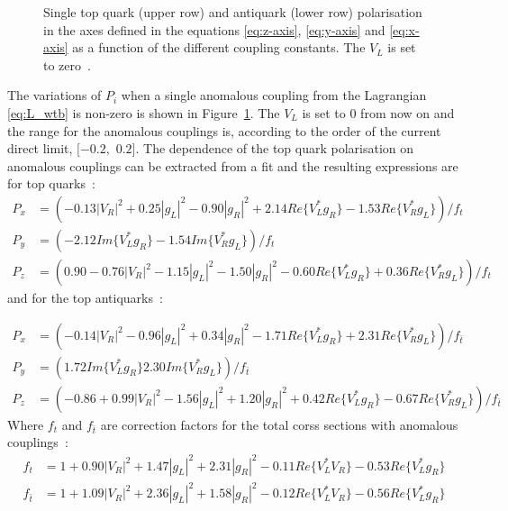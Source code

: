 \begin{figure}
\caption{Single top quark (upper row) and antiquark (lower row) polarisation in the axes defined in the equations \eqref{eq:z-axis}, \eqref{eq:y-axis} and \ref{eq:x-axis} as a function of the different coupling constants. The $V_L$ is set to zero~\cite{Aguilar-Saavedra:2014eqa}.} \label{Fig:Polarisation6pack}
\end{figure}

The variations of $P_i$ when a single anomalous coupling from the Lagrangian  \eqref{eq:L_wtb} is non-zero is shown in Figure~\ref{Fig:Polarisation6pack}. The $V_L$ is set to 0 from now on and the range for the anomalous couplings is, according to the order of the current direct limit, $[-0.2,$ $0.2]$. The dependence of the top quark polarisation on anomalous couplings can be extracted from a fit and the resulting expressions are for top quarks~\cite{Aguilar-Saavedra:2014eqa}:
\begin{align*} %
P_x &= (-0.13|V_R|^2+0.25|g_L|^2-0.90|g_R|^2  +2.14 Re\{ V_L^* g_R \} -1.53Re\{ V_R^* g_L \})/f_t \\
P_y &= (-2.12Im\{ V_L^* g_R \} -1.54Im\{ V_R^* g_L \})/f_t \\
P_z &= (0.90 - 0.76|V_R|^2 -1.15|g_L|^{2}-1.50|g_R|^{2}-0.60 Re\{ V_L^* g_R \} +0.36 Re\{ V_R^* g_L \})/f_t
\end{align*}
and for the top antiquarks~\cite{Aguilar-Saavedra:2014eqa}:

\begin{align*} %
P_x &= (-0.14|V_R|^2-0.96|g_L|^2+0.34|g_R|^2 -1.71 Re\{ V_L^* g_R \} +2.31 Re\{ V_R^* g_L \})/f_{\bar{t}} \\
P_y &= (1.72 Im\{ V_L^* g_R \} 2.30 Im\{ V_R^* g_L \})/f_{\bar{t}} \\
P_z &= (-0.86 +0.99 |V_R|^2 -1.56|g_L|^{2}+1.20|g_R|^{2}+0.42Re\{ V_L^* g_R \} - 0.67Re\{ V_R^* g_L \})/f_{\bar{t}}
\end{align*}
Where $f_t$ and $f_{\bar{t}}$ are correction factors for the total corss sections with anomalous couplings~\cite{AguilarSaavedra:2008gt}:
\begin{align*}
f_t &= 1+0.90|V_R|^{2} + 1.47|g_L|^{2}+2.31|g_R|^{2}-0.11Re\{ V_L^* V_R \} - 0.53 Re\{ V_L^* g_R \} \\
f_{\bar{t}} &= 1+1.09|V_R|^{2} + 2.36|g_L|^{2}+1.58|g_R|^{2}-0.12Re\{ V_L^* V_R \} - 0.56 Re\{ V_L^* g_R \}
\end{align*}

